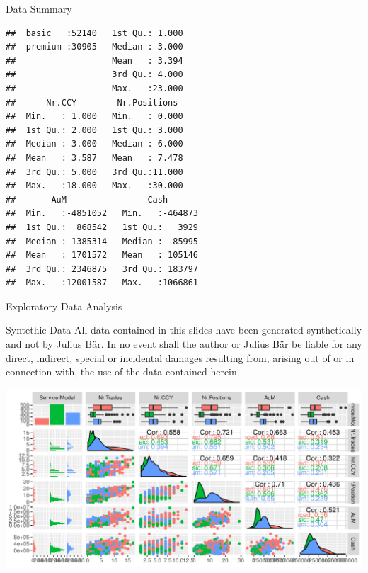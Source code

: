 \documentclass{beamer}\usepackage[]{graphicx}\usepackage[]{color}
\makeatletter
\newenvironment{kframe}{%
 \def\at@end@of@kframe{}%
 \ifinner\ifhmode%
  \def\at@end@of@kframe{\end{minipage}}%
  \begin{minipage}{\columnwidth}%
 \fi\fi%
 \def\FrameCommand##1{\hskip\@totalleftmargin \hskip-\fboxsep
 \colorbox{shadecolor}{##1}\hskip-\fboxsep
     \hskip-\linewidth \hskip-\@totalleftmargin \hskip\columnwidth}%
 \MakeFramed {\advance\hsize-\width
   \@totalleftmargin\z@ \linewidth\hsize
   \@setminipage}}%
 {\par\unskip\endMakeFramed%
 \at@end@of@kframe}
\newenvironment{knitrout}{}{} %
\makeatother
\begin{document}
\begin{frame}[fragile]{Data Summary}
\begin{minipage}[t]{0.45\textwidth}
\begin{knitrout}
\begin{kframe}
\begin{verbatim}
##  basic   :52140   1st Qu.: 1.000  
##  premium :30905   Median : 3.000  
##                   Mean   : 3.394  
##                   3rd Qu.: 4.000  
##                   Max.   :23.000  
##      Nr.CCY        Nr.Positions   
##  Min.   : 1.000   Min.   : 0.000  
##  1st Qu.: 2.000   1st Qu.: 3.000  
##  Median : 3.000   Median : 6.000  
##  Mean   : 3.587   Mean   : 7.478  
##  3rd Qu.: 5.000   3rd Qu.:11.000  
##  Max.   :18.000   Max.   :30.000  
##       AuM                Cash        
##  Min.   :-4851052   Min.   :-464873  
##  1st Qu.:  868542   1st Qu.:   3929  
##  Median : 1385314   Median :  85995  
##  Mean   : 1701572   Mean   : 105146  
##  3rd Qu.: 2346875   3rd Qu.: 183797  
##  Max.   :12001587   Max.   :1066861
\end{verbatim}
\end{kframe}
\end{knitrout}
\end{minipage}
\end{frame}
\begin{frame}[fragile]{Exploratory Data Analysis}
\tiny

{
\begin{block}{\tiny Syntethic Data}
All data contained in this slides have been generated synthetically and not by Julius B\"{a}r. In no event shall the author or Julius B\"{a}r be liable for any direct, indirect, special or incidental damages resulting from, arising out of or in connection with, the use of the data contained herein.
\end{block}
}
\begin{knitrout}
\color{fgcolor}
\includegraphics[width=\linewidth]{figure/plots_ggpairs-1} 

\end{knitrout}


\end{frame}
\end{document}
